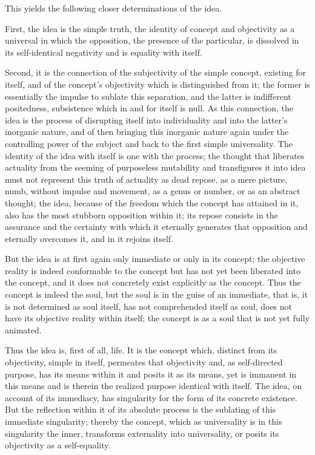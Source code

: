This yields the following closer determinations of the idea.

First, the idea is the simple truth,
the identity of concept and objectivity as a
universal in which the opposition,
the presence of the particular,
is dissolved in its self-identical negativity
and is equality with itself.

Second, it is the connection of the subjectivity
of the simple concept, existing for itself,
and of the concept's objectivity which is distinguished from it;
the former is essentially the impulse to sublate this separation,
and the latter is indifferent positedness,
subsistence which in and for itself is null.
As this connection, the idea is
the process of disrupting itself into individuality
and into the latter's inorganic nature,
and of then bringing this inorganic nature again
under the controlling power of the subject
and back to the first simple universality.
The identity of the idea with itself is one with the process;
the thought that liberates actuality from
the seeming of purposeless mutability
and transfigures it into idea
must not represent this truth of actuality
as dead repose, as a mere picture, numb, without impulse and movement,
as a genus or number, or as an abstract thought;
the idea, because of the freedom which the concept has attained in it,
also has the most stubborn opposition within it;
its repose consists in the assurance and the certainty
with which it eternally generates that opposition
and eternally overcomes it, and in it rejoins itself.

But the idea is at first again only immediate or only in its concept;
the objective reality is indeed conformable to the concept
but has not yet been liberated into the concept,
and it does not concretely exist explicitly as the concept.
Thus the concept is indeed the soul,
but the soul is in the guise of an immediate,
that is, it is not determined as soul itself,
has not comprehended itself as soul,
does not have its objective reality within itself;
the concept is as a soul that is not yet fully animated.

Thus the idea is, first of all, life.
It is the concept which, distinct from its objectivity,
simple in itself, permeates that objectivity
and, as self-directed purpose, has its means within it
and posits it as its means, yet is immanent in this means
and is therein the realized purpose identical with itself.
The idea, on account of its immediacy, has singularity
for the form of its concrete existence.
But the reflection within it of its absolute process is
the sublating of this immediate singularity;
thereby the concept, which as universality is
in this singularity the inner,
transforms externality into universality,
or posits its objectivity as a self-equality.

